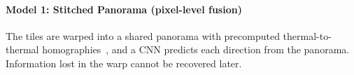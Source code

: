 
\paragraph{Model 1: Stitched Panorama (pixel-level fusion)}
The tiles are warped into a shared panorama with precomputed thermal-to-thermal homographies~\cite{dahmaniThermalHomographyPhotovoltaic2025,ansarPerformanceEvaluationFeature2024}, and a CNN predicts each direction from the panorama. Information lost in the warp cannot be recovered later.


